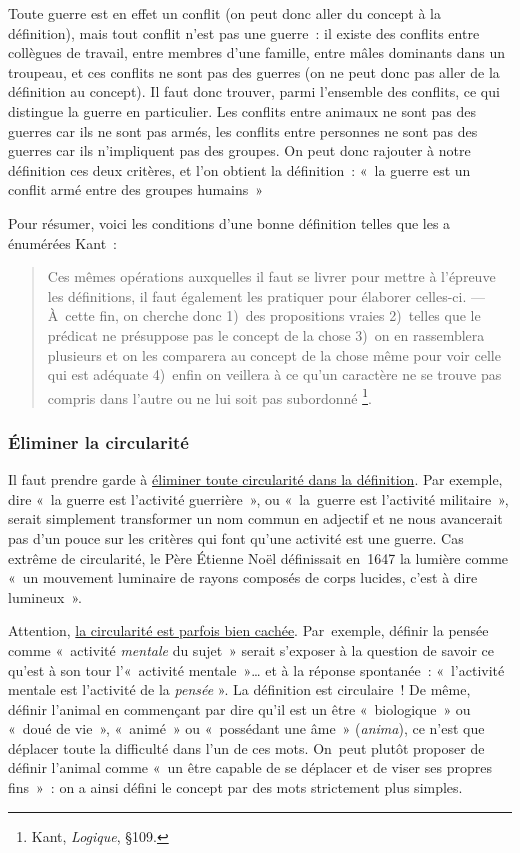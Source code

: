 \documentclass[a4paper,12pt]{article}
\begin{document}
Toute guerre est en effet un conflit (on peut donc aller du concept à la
définition), mais tout conflit n'est pas une guerre : il existe des
conflits entre collègues de travail, entre membres d'une famille, entre
mâles dominants dans un troupeau, et ces conflits ne sont pas des
guerres (on ne peut donc pas aller de la définition au concept). Il faut
donc trouver, parmi l'ensemble des conflits, ce qui distingue la guerre
en particulier. Les conflits entre animaux ne sont pas des guerres car
ils ne sont pas armés, les conflits entre personnes ne sont pas des
guerres car ils n'impliquent pas des groupes. On peut donc rajouter à
notre définition ces deux critères, et l'on obtient la définition : « la
guerre est un conflit armé entre des groupes humains »

Pour résumer, voici les conditions d'une bonne définition telles que les
a énumérées Kant :
\begin{quote}
Ces mêmes opérations auxquelles il faut se livrer pour mettre à
l'épreuve les définitions, il faut également les pratiquer pour
élaborer celles-ci. --- À cette fin, on cherche donc 1) des
propositions vraies 2) telles que le prédicat ne présuppose pas le
concept de la chose 3) on en rassemblera plusieurs et on les comparera
au concept de la chose même pour voir celle qui est adéquate 4) enfin
on veillera à ce qu'un caractère ne se trouve pas compris dans l'autre
ou ne lui soit pas subordonné \footnote{Kant, \emph{Logique}, §109.}.
\end{quote}

\subsubsection{Éliminer la circularité}
\label{sec:org4ed105b}

Il faut prendre garde à \uline{éliminer toute circularité dans la définition}.
Par exemple, dire « la guerre est l'activité guerrière », ou « la guerre
est l'activité militaire », serait simplement transformer un nom commun
en adjectif et ne nous avancerait pas d'un pouce sur les critères qui
font qu'une activité est une guerre. Cas extrême de circularité, le Père
Étienne Noël définissait en 1647 la lumière comme « un mouvement
luminaire de rayons composés de corps lucides, c'est à dire lumineux ».

Attention, \uline{la circularité est parfois bien cachée}. Par exemple,
définir la pensée comme « activité \emph{mentale} du sujet » serait s'exposer
à la question de savoir ce qu'est à son tour l'« activité mentale »\ldots{}
et à la réponse spontanée : « l'activité mentale est l'activité de la
\emph{pensée} ». La définition est circulaire ! De même, définir l'animal en
commençant par dire qu'il est un être « biologique » ou « doué de vie »,
« animé » ou « possédant une âme » (\emph{anima}), ce n'est que déplacer
toute la difficulté dans l'un de ces mots. On peut plutôt proposer de
définir l'animal comme « un être capable de se déplacer et de viser ses
propres fins » : on a ainsi défini le concept par des mots strictement
plus simples.
\end{document}
